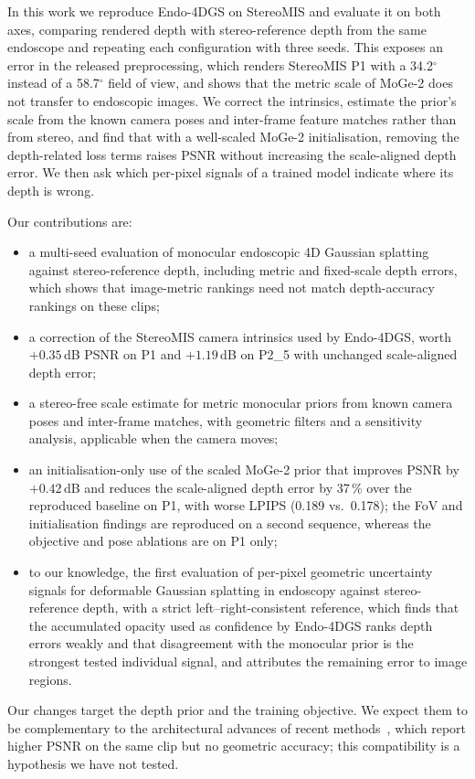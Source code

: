 \documentclass[conference]{IEEEtran}
\begin{document}
In this work we reproduce Endo-4DGS on StereoMIS and evaluate it on both axes, comparing rendered depth with stereo-reference depth from the same endoscope and repeating each configuration with three seeds. This exposes an error in the released preprocessing, which renders StereoMIS P1 with a 34.2$^\circ$ instead of a 58.7$^\circ$ field of view, and shows that the metric scale of MoGe-2 does not transfer to endoscopic images. We correct the intrinsics, estimate the prior's scale from the known camera poses and inter-frame feature matches rather than from stereo, and find that with a well-scaled MoGe-2 initialisation, removing the depth-related loss terms raises PSNR without increasing the scale-aligned depth error. We then ask which per-pixel signals of a trained model indicate where its depth is wrong.

Our contributions are:
\begin{itemize}
\item a multi-seed evaluation of monocular endoscopic 4D Gaussian splatting against stereo-reference depth, including metric and fixed-scale depth errors, which shows that image-metric rankings need not match depth-accuracy rankings on these clips;
\item a correction of the StereoMIS camera intrinsics used by Endo-4DGS, worth $+0.35$\,dB PSNR on P1 and $+1.19$\,dB on P2\_5 with unchanged scale-aligned depth error;
\item a stereo-free scale estimate for metric monocular priors from known camera poses and inter-frame matches, with geometric filters and a sensitivity analysis, applicable when the camera moves;
\item an initialisation-only use of the scaled MoGe-2 prior that improves PSNR by $+0.42$\,dB and reduces the scale-aligned depth error by 37\,\% over the reproduced baseline on P1, with worse LPIPS (0.189 vs.\ 0.178); the FoV and initialisation findings are reproduced on a second sequence, whereas the objective and pose ablations are on P1 only;
\item to our knowledge, the first evaluation of per-pixel geometric uncertainty signals for deformable Gaussian splatting in endoscopy against stereo-reference depth, with a strict left--right-consistent reference, which finds that the accumulated opacity used as confidence by Endo-4DGS ranks depth errors weakly and that disagreement with the monocular prior is the strongest tested individual signal, and attributes the remaining error to image regions.
\end{itemize}
Our changes target the depth prior and the training objective. We expect them to be complementary to the architectural advances of recent methods~\cite{yu2026endopairgs,liu2025endog2t,wu2025endowave}, which report higher PSNR on the same clip but no geometric accuracy; this compatibility is a hypothesis we have not tested.
\end{document}
